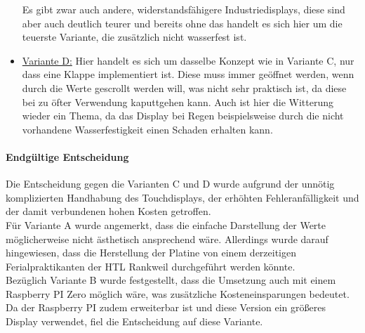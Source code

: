\begin{itemize}
    Es gibt zwar auch andere, widerstandsfähigere Industriedisplays, diese sind aber auch deutlich teurer und bereits ohne das handelt es sich hier um die teuerste Variante, die zusätzlich nicht wasserfest ist.
	\item \underline{Variante D:} Hier handelt es sich um dasselbe Konzept wie in Variante C, nur dass eine Klappe implementiert ist. Diese muss immer geöffnet werden, wenn durch die Werte gescrollt werden will, was nicht sehr praktisch ist, da diese bei zu öfter Verwendung kaputtgehen kann. Auch ist hier die Witterung wieder ein Thema, da das Display bei Regen beispielsweise durch die nicht vorhandene Wasserfestigkeit einen Schaden erhalten kann.
\end{itemize}

\paragraph{Endgültige Entscheidung}
Die Entscheidung gegen die Varianten C und D wurde aufgrund der unnötig komplizierten Handhabung des Touchdisplays, der erhöhten Fehleranfälligkeit und der damit verbundenen hohen Kosten getroffen. \\
Für Variante A wurde angemerkt, dass die einfache Darstellung der Werte möglicherweise nicht ästhetisch ansprechend wäre. Allerdings wurde darauf hingewiesen, dass die Herstellung der Platine von einem derzeitigen Ferialpraktikanten der HTL Rankweil durchgeführt werden könnte. \\
Bezüglich Variante B wurde festgestellt, dass die Umsetzung auch mit einem Raspberry PI Zero möglich wäre, was zusätzliche Kosteneinsparungen bedeutet. Da der Raspberry PI zudem erweiterbar ist und diese Version ein größeres Display verwendet, fiel die Entscheidung auf diese Variante.
